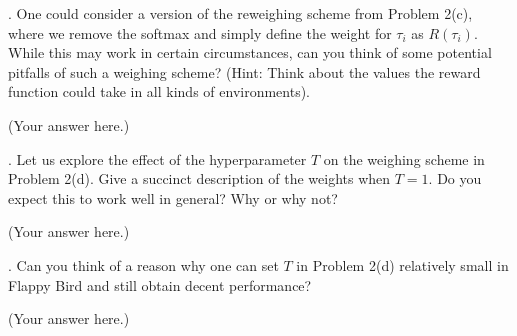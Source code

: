 \documentclass[12pt]{article}
\begin{document}
        . One could consider a version of the reweighing scheme from Problem 2(c), where we remove the softmax and simply define the weight for $\tau_i$ as $R(\tau_i)$. While this may work in certain circumstances, can you think of some potential pitfalls of such a weighing scheme? \newline
        (Hint: Think about the values the reward function could take in all kinds of environments).
        \begin{solution}
            (Your answer here.)
        \end{solution}

        . Let us explore the effect of the hyperparameter $T$ on the weighing scheme in Problem 2(d). Give a succinct description of the weights when $T = 1$. Do you expect this to work well in general? Why or why not?
        \begin{solution}
            (Your answer here.)
        \end{solution}
        
        . Can you think of a reason why one can set $T$ in Problem 2(d) relatively small in Flappy Bird and still obtain decent performance?
        \begin{solution}
            (Your answer here.)
        \end{solution}
\end{document}
